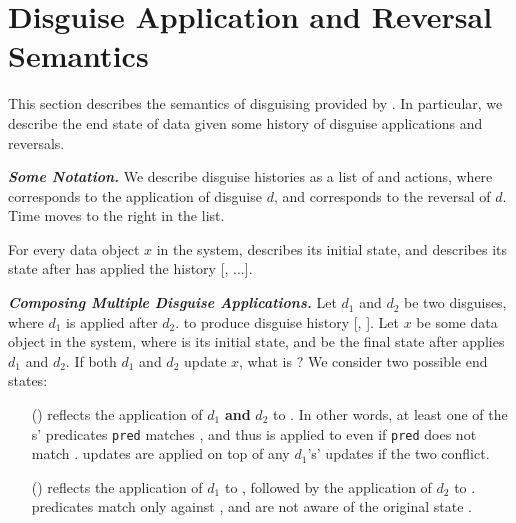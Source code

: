 \section{Disguise Application and Reversal Semantics}
\label{sec:comp}
This section describes the semantics of disguising provided by \sys. In particular, we describe the
end state of data given some history of disguise applications and reversals.

\vspace{6pt}\noindent\textbf{\emph{Some Notation.}}
We describe disguise histories as a list of  and  actions, where  corresponds
to the application of disguise $d$, and  corresponds to the reversal of $d$. Time moves to
the right in the list.

For every data object $x$ in the system, \xstart describes its initial state, and
 describes its state after \sys has applied the history [,
$\dots$].

\vspace{6pt}\noindent\textbf{\emph{Composing Multiple Disguise Applications.}}
Let $d_1$ and $d_2$ be two disguises, where $d_1$ is applied after $d_2$.
to produce disguise history [, ]. 
%
Let $x$ be some data object in the system, where \xstart is its initial state, and
 be the final state after \sys applies $d_1$ and $d_2$.
%
If both $d_1$ and $d_2$ update $x$, what is ?
We consider two possible end states: 
%
\begin{enumerate}
\item[(\appcompone)]  reflects the application of $d_1$ \textbf{and} $d_2$ to \xstart. In other
words, at least one of the s' predicates \texttt{pred} matches \xstart, and thus  is
applied to \xhist[\app{d_1}] even if \texttt{pred} does not match \xhist[\app{d_1}]. 
 updates are applied on top of any $d_1$'s' updates if the two conflict.

\item[(\appcomptwo)]  reflects the application of $d_1$ to \xstart, followed
by the application of $d_2$ to \xhist{[\app{d_1}]}.  predicates match only against
\xhist{[\app{d_1}]}, and are not aware of the original state \xstart.
\end{enumerate}

